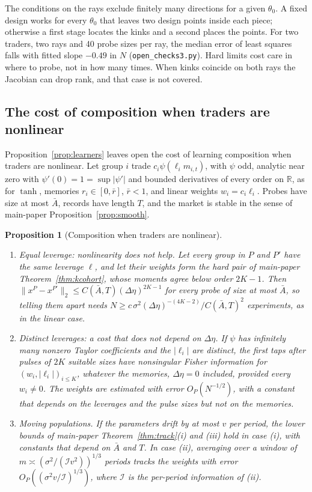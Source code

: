 \documentclass[12pt]{article}
\newtheorem{proposition}[theorem]{Proposition}
\theoremstyle{definition}
\theoremstyle{remark}
\begin{document}
The conditions on the rays exclude finitely many directions for a given $\theta_0$. A fixed design works for every $\theta_0$ that leaves two design points inside each piece; otherwise a first stage locates the kinks and a second places the points. For two traders, two rays and 40 probe sizes per ray, the median error of least squares falls with fitted slope $-0.49$ in $N$ (\nolinkurl{open_checks3.py}). Hard limits cost care in where to probe, not in how many times. When kinks coincide on both rays the Jacobian can drop rank, and that case is not covered.

\subsection{The cost of composition when traders are nonlinear}

Proposition~\ref{prop:learners} leaves open the cost of learning composition when traders are nonlinear. Let group $i$ trade $c_i\psi(\ell_im_{i,t})$, with $\psi$ odd, analytic near zero with $\psi'(0)=1=\sup|\psi'|$ and bounded derivatives of every order on $\mathbb R$, as for $\tanh$, memories $r_i\in[0,\bar r]$, $\bar r<1$, and linear weights $w_i=c_i\ell_i$. Probes have size at most $\bar A$, records have length $T$, and the market is stable in the sense of main-paper Proposition~\ref{prop:smooth}.

\begin{proposition}[Composition when traders are nonlinear]\label{prop:nlcost}
\begin{enumerate}[label=(\roman*),itemsep=1pt]
\item \emph{Equal leverage: nonlinearity does not help.} Let every group in $P$ and $P'$ have the same leverage $\ell$, and let their weights form the hard pair of main-paper Theorem~\ref{thm:kcohort}, whose moments agree below order $2K-1$. Then $\|x^P-x^{P'}\|_2\le C(\bar A,T)(\Delta\eta)^{2K-1}$ for every probe of size at most $\bar A$, so telling them apart needs $N\ge c\,\sigma^2(\Delta\eta)^{-(4K-2)}/C(\bar A,T)^2$ experiments, as in the linear case.
\item \emph{Distinct leverages: a cost that does not depend on $\Delta\eta$.} If $\psi$ has infinitely many nonzero Taylor coefficients and the $|\ell_i|$ are distinct, the first taps after pulses of $2K$ suitable sizes have nonsingular Fisher information for $(w_i,|\ell_i|)_{i\le K}$, whatever the memories, $\Delta\eta=0$ included, provided every $w_i\ne0$. The weights are estimated with error $O_P(N^{-1/2})$, with a constant that depends on the leverages and the pulse sizes but not on the memories.
\item \emph{Moving populations.} If the parameters drift by at most $v$ per period, the lower bounds of main-paper Theorem~\ref{thm:track}(i) and (iii) hold in case (i), with constants that depend on $\bar A$ and $T$. In case (ii), averaging over a window of $m\asymp(\sigma^2/(\mathcal Iv^2))^{1/3}$ periods tracks the weights with error $O_P((\sigma^2v/\mathcal I)^{1/3})$, where $\mathcal I$ is the per-period information of (ii).
\end{enumerate}
\end{proposition}
\end{document}
